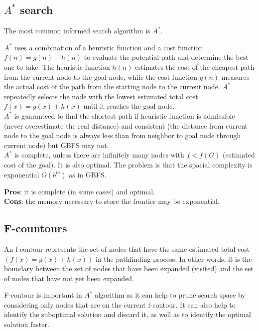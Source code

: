 \documentclass{article}
\begin{document}
\subsection{$A^*$ search}

The most common informed search algorithm is $A^*$.

$A^*$ uses a combination of a heuristic function and a cost function $f(n) = g(n) + h(n)$ to evaluate the potential path and determine the best one to take. The heuristic function $h(n)$ estimates the cost of the cheapest path from the current node to the goal node, while the cost function $g(n)$ measures the actual cost of the path from the starting node to the current node. $A^*$ repeatedly selects the node with the lowest estimated total cost $f(x) = g(x) + h(x)$ until it reaches the goal node. \\

$A^*$ is guaranteed to find the shortest path if heuristic function is admissible (never overestimate the real distance) and consistent (the distance from current node to the goal node is always less than from neighbor to goal node through current node) but GBFS may not. \\

$A^*$ is complete, unless there are infinitely many nodes with $f < f(G)$ (estimated cost of the goal).
It is also optimal. The problem is that the spacial complexity is exponential $O(b^m)$ as in GBFS. \\

\begin{flushleft}
    \textbf{Pros}: it is complete (in some cases) and optimal. \\
    \textbf{Cons}: the memory necessary to store the frontier may be exponential.
\end{flushleft}

\newpage

\subsection{F-countours}

An f-contour represents the set of nodes that have the same estimated total cost $(f(x) = g(x) + h(x))$ in the pathfinding process. In other words, it is the boundary between the set of nodes that have been expanded (visited) and the set of nodes that have not yet been expanded.

F-contour is important in $A^*$ algorithm as it can help to prune search space by considering only nodes that are on the current f-contour. It can also help to identify the suboptimal solution and discard it, as well as to identify the optimal solution faster.
\end{document}
